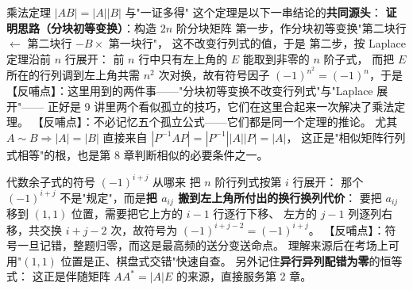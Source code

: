 \begin{fdeep}{乘法定理 $|AB|=|A||B|$ 与"一证多得"}
这个定理是以下一串结论的\textbf{共同源头}：
\textbf{证明思路（分块初等变换）}：构造 $2n$ 阶分块矩阵
第一步，作分块初等变换"第二块行 $\leftarrow$ 第二块行 $-B\times$ 第一块行"，
这不改变行列式的值，于是
第二步，按 Laplace 定理沿前 $n$ 行展开：
前 $n$ 行中只有左上角的 $E$ 能取到非零的 $n$ 阶子式，
而把 $E$ 所在的行列调到左上角共需 $n^{2}$ 次对换，故有符号因子 $(-1)^{n^{2}}=(-1)^{n}$，于是
【反哺点】：这里用到的两件事——"分块初等变换不改变行列式"与"Laplace 展开"——
正好是 9 讲里两个看似孤立的技巧，它们在这里合起来一次解决了乘法定理。
【反哺点】：不必记忆五个孤立公式——它们都是同一个定理的推论。
尤其 $A\sim B\Rightarrow|A|=|B|$ 直接来自 $|P^{-1}AP|=|P^{-1}||A||P|=|A|$，
这正是"相似矩阵行列式相等"的根，也是第 8 章判断相似的必要条件之一。
\end{fdeep}

\begin{fdeep}{代数余子式的符号 $(-1)^{i+j}$ 从哪来}
把 $n$ 阶行列式按第 $i$ 行展开：
那个 $(-1)^{i+j}$ 不是"规定"，而是\textbf{把 $a_{ij}$ 搬到左上角所付出的换行换列代价}：
要把 $a_{ij}$ 移到 $(1,1)$ 位置，需要把它上方的 $i-1$ 行逐行下移、
左方的 $j-1$ 列逐列右移，共交换 $i+j-2$ 次，故符号为 $(-1)^{i+j-2}=(-1)^{i+j}$。
【反哺点】：符号一旦记错，整题归零，而这是最高频的送分变送命点。
理解来源后在考场上可用"$(1,1)$ 位置是正、棋盘式交错"快速自查。
另外记住\textbf{异行异列配错为零}的恒等式：
这正是伴随矩阵 $AA^{*}=|A|E$ 的来源，直接服务第 2 章。
\end{fdeep}

